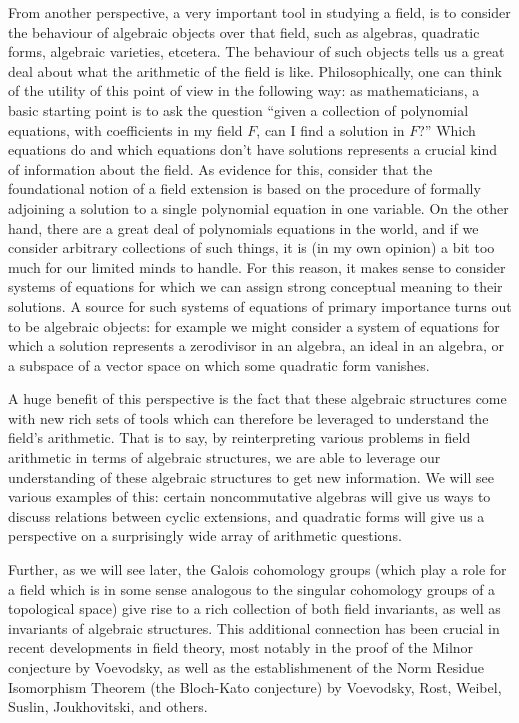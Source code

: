 \documentclass[12pt]{report}
\theoremstyle{plain}
\begin{document}
From another perspective, a very important tool in studying a field, is to
consider the behaviour of algebraic objects over that field, such as
algebras, quadratic forms, algebraic varieties, etcetera. The behaviour of
such objects tells us a great deal about what the arithmetic of the field
is like. Philosophically, one can think of the utility of this point of
view in the following way: as mathematicians, a basic starting point is to
ask the question ``given a collection of polynomial equations, with
coefficients in my field $F$, can I find a solution in $F$?'' Which
equations do and which equations don't have solutions represents a crucial
kind of information about the field. As evidence for this, consider that
the foundational notion of a field extension is based on the procedure of
formally adjoining a solution to a single polynomial equation in one
variable. On the other hand, there are a great deal of polynomials
equations in the world, and if we consider arbitrary collections of such
things, it is (in my own opinion) a bit too much for our limited minds to
handle. For this reason, it makes sense to consider systems of equations
for which we can assign strong conceptual meaning to their solutions. A
source for such systems of equations of primary importance turns out to be
algebraic objects: for example we might consider a system of equations for
which a solution represents a zerodivisor in an algebra, an ideal in an
algebra, or a subspace of a vector space on which some quadratic form
vanishes.

A huge benefit of this perspective is the fact that these algebraic
structures come with new rich sets of tools which can therefore be
leveraged to understand the field's arithmetic. That is to say, by
reinterpreting various problems in field arithmetic in terms of algebraic
structures, we are able to leverage our understanding of these algebraic
structures to get new information. We will see various examples of this:
certain noncommutative algebras will give us ways to discuss
relations between cyclic extensions, and quadratic forms will give us a
perspective on a surprisingly wide array of arithmetic questions.

Further, as we will see later, the Galois cohomology groups (which play a
role for a field which is in some sense analogous to the singular
cohomology groups of a topological space) give rise to a rich collection of
both field invariants, as well as invariants of algebraic structures. This
additional connection has been crucial in recent developments in field
theory, most notably in the proof of the Milnor conjecture by Voevodsky, as
well as the establishmenent of the Norm Residue Isomorphism Theorem (the
Bloch-Kato conjecture) by Voevodsky, Rost, Weibel, Suslin, Joukhovitski,
and others.
\end{document}
